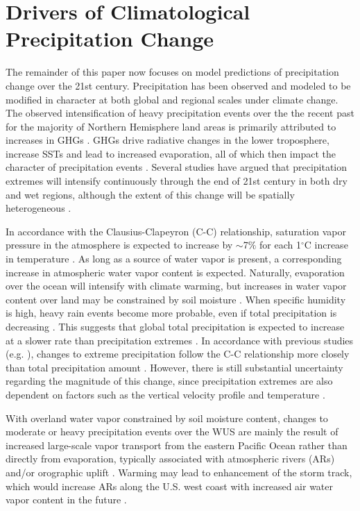 \section{Drivers of Climatological Precipitation Change} \label{sec:ChangeDrivers}

The remainder of this paper now focuses on model predictions of precipitation change over the 21st century.  Precipitation has been observed and modeled to be modified in character at both global and regional scales under climate change. The observed intensification of heavy precipitation events over the the recent past for the majority of Northern Hemisphere land areas is primarily attributed to increases in GHGs \cite{min2011human}.  GHGs drive radiative changes in the lower troposphere, increase SSTs and lead to increased evaporation, all of which then impact the character of precipitation events \cite{allen2002constraints, sugi2004mechanism}. Several studies have argued that precipitation extremes will intensify continuously through the end of 21st century in both dry and wet regions, although the extent of this change will be spatially heterogeneous \cite{donat2016more}.


In accordance with the Clausius-Clapeyron (C-C) relationship, saturation vapor pressure in the atmosphere is expected to increase by $\sim$7$\%$ for each 1$^\circ$C increase in temperature \cite{allan2008atmospheric}.  As long as a source of water vapor is present, a corresponding increase in atmospheric water vapor content is expected.  Naturally, evaporation over the ocean will intensify with climate warming, but increases in water vapor content over land may be constrained by soil moisture \cite{cayan2010future}. When specific humidity is high, heavy rain events become more probable, even if total precipitation is decreasing \cite{trenberth2011changes}.  This suggests that global total precipitation is expected to increase at a slower rate than precipitation extremes \cite{allan2008atmospheric}. In accordance with previous studies (e.g. \cite{allan2008atmospheric, o2009physical, min2011human}), changes to extreme precipitation follow the C-C relationship more closely than total precipitation amount \cite{trenberth2003changing}. However, there is still substantial uncertainty regarding the magnitude of this change, since precipitation extremes are also dependent on factors such as the vertical velocity profile and temperature \cite{o2009physical}.

With overland water vapor constrained by soil moisture content, changes to moderate or heavy precipitation events over the WUS are mainly the result of increased large-scale vapor transport from the eastern Pacific Ocean rather than directly from evaporation, typically associated with atmospheric rivers (ARs) and/or orographic uplift \cite{trenberth2003changing, neiman2008meteorological}. Warming may lead to enhancement of the storm track, which would increase ARs along the U.S. west coast with increased air water vapor content in the future \cite{dettinger2011climate, gao2015dynamical}.


